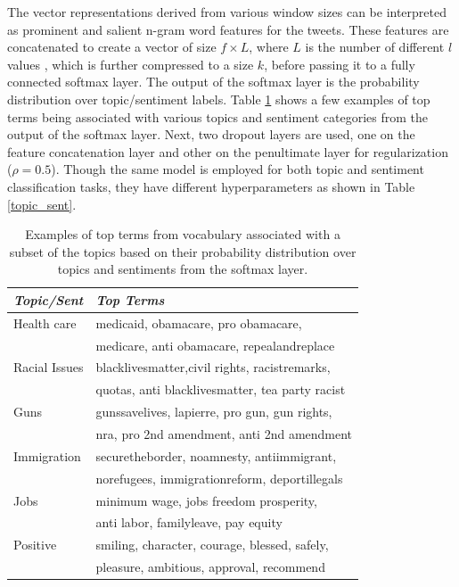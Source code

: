 \documentclass[letterpaper]{article}
\begin{document}
The vector representations derived from various window sizes can be interpreted as prominent and salient n-gram word features for the tweets. These features are concatenated to create a vector of size $f \times L$, where $L$ is the number of different $l$ values , which is further compressed to a size $k$, before passing it to a fully connected softmax layer. The output of the softmax layer is the probability distribution over topic/sentiment labels. Table \ref{qe} shows a few examples of top terms being associated with various topics and sentiment categories from the output of the softmax layer. Next, two dropout layers are used, one on the feature concatenation layer and other on the penultimate layer for regularization ($\rho=0.5$). Though the same model is employed for both topic and sentiment classification tasks, they have different hyperparameters as shown in Table \ref{topic_sent}.



\begin{table}[h]
\centering
\small

\begin{adjustbox}{width=0.79\columnwidth}
\begin{tabular}{|l|l|}
\hline %
\emph{Topic/Sent} & \emph{Top Terms} \\ \hline
Health care & medicaid, obamacare, pro obamacare, \\ & medicare, anti obamacare, repealandreplace \\\hline
Racial Issues & blacklivesmatter,civil rights, racistremarks,\\&  quotas, anti blacklivesmatter, tea party racist \\\hline
Guns & gunssavelives, lapierre, pro gun, gun rights, \\ & nra, pro 2nd amendment, anti 2nd amendment \\\hline
Immigration & securetheborder, noamnesty, antiimmigrant, \\& norefugees, immigrationreform, deportillegals \\\hline
Jobs & minimum wage, jobs freedom prosperity, \\ & anti labor, familyleave, pay equity \\\hline
Positive & smiling, character, courage, blessed, safely,\\ & pleasure, ambitious, approval, recommend \\\hline


\end{tabular}
\end{adjustbox}
\caption{Examples of top terms from vocabulary associated with a subset of the topics based on their probability distribution over topics and sentiments from the softmax layer.}
\label{qe} %
\end{table}
\end{document}
